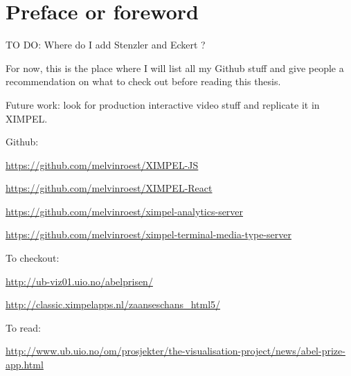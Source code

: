 
\section{Preface or foreword}


TO DO: Where do I add Stenzler and Eckert \cite{stenzler1996}?

For now, this is the place where I will list all my Github stuff and give people a recommendation on what to check out before reading this thesis.


Future work:
look for production interactive video stuff and replicate it in XIMPEL.


Github:

\url{https://github.com/melvinroest/XIMPEL-JS}

\url{https://github.com/melvinroest/XIMPEL-React}

\url{https://github.com/melvinroest/ximpel-analytics-server}

\url{https://github.com/melvinroest/ximpel-terminal-media-type-server}

To checkout:

\url{http://ub-viz01.uio.no/abelprisen/}

\url{http://classic.ximpelapps.nl/zaanseschans_html5/}

To read:

\url{http://www.ub.uio.no/om/prosjekter/the-visualisation-project/news/abel-prize-app.html}



